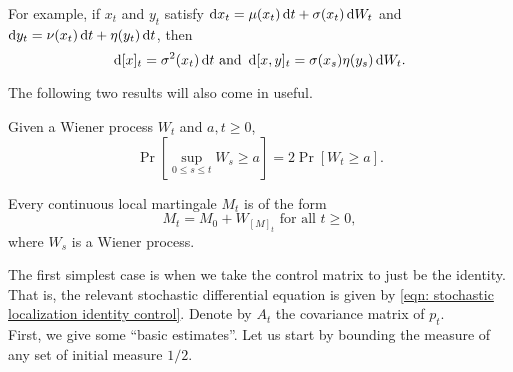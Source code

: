 \documentclass{article}
\begin{document}
		For example, if $x_t$ and $y_t$ satisfy $\operatorname{d}\!{x}_t = \mu(x_t) \operatorname{d}\!{t} + \sigma(x_t)\operatorname{d}\!{W}_t$ and $\operatorname{d}\!{y}_t = \nu(x_t) \operatorname{d}\!{t} + \eta(y_t) \operatorname{d}\!{t}$, then
		\[ \operatorname{d}\!{[x]_t} = \sigma^2(x_t) \operatorname{d}\!{t} \text{ and } \operatorname{d}\!{[x,y]_t} = \sigma(x_s)\eta(y_s) \operatorname{d}\!{W_t}. \]

		The following two results will also come in useful.

		\begin{lemma}
			\label{reflection principle}
			Given a Wiener process $W_t$ and $a,t\geq 0$,
			\[ \Pr\left[\sup_{0 \leq s \leq t} W_s \geq a\right] = 2 \Pr\left[W_t \geq a\right]. \]
		\end{lemma}

		\begin{theorem}
			\label{Dambis Dubins Schwarz Th}
			Every continuous local martingale $M_t$ is of the form
			\[ M_t = M_0 + W_{[M]_t} \text{ for all } t \geq 0, \]
			where $W_s$ is a Wiener process.
		\end{theorem}

		The first simplest case is when we take the control matrix to just be the identity. That is, the relevant stochastic differential equation is given by \eqref{eqn: stochastic localization identity control}. Denote by $A_t$ the covariance matrix of $p_t$.\\


		First, we give some ``basic estimates''. Let us start by bounding the measure of any set of initial measure $1/2$.
\end{document}
